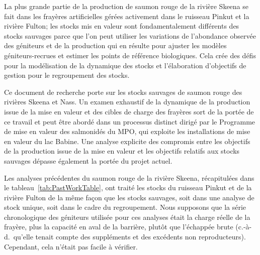 \documentclass[french,11pt]{book}
\begin{document}
La plus grande partie de la production de saumon rouge de la rivière Skeena se fait dans les frayères artificielles gérées activement dans le ruisseau Pinkut et la rivière Fulton; les stocks mis en valeur sont fondamentalement différents des stocks sauvages parce que l'on peut utiliser les variations de l'abondance observée des géniteurs et de la production qui en résulte pour ajuster les modèles géniteurs-recrues et estimer les points de référence biologiques. Cela crée des défis pour la modélisation de la dynamique des stocks et l'élaboration d'objectifs de gestion pour le regroupement des stocks.

Ce document de recherche porte sur les stocks sauvages de saumon rouge des rivières Skeena et Nass. Un examen exhaustif de la dynamique de la production issue de la mise en valeur et des cibles de charge des frayères sort de la portée de ce travail et peut être abordé dans un processus distinct dirigé par le Programme de mise en valeur des salmonidés du MPO, qui exploite les installations de mise en valeur du lac Babine. Une analyse explicite des compromis entre les objectifs de la production issue de la mise en valeur et les objectifs relatifs aux stocks sauvages dépasse également la portée du projet actuel.

Les analyses précédentes du saumon rouge de la rivière Skeena, récapitulées dans le tableau~\ref{tab:PastWorkTable}, ont traité les stocks du ruisseau Pinkut et de la rivière Fulton de la même façon que les stocks sauvages, soit dans une analyse de stock unique, soit dans le cadre du regroupement. Nous supposons que la série chronologique des géniteurs utilisée pour ces analyses était la charge réelle de la frayère, plus la capacité en aval de la barrière, plutôt que l'échappée brute (c.-à-d.~qu'elle tenait compte des suppléments et des excédents non reproducteurs). Cependant, cela n'était pas facile à vérifier.
\end{document}
